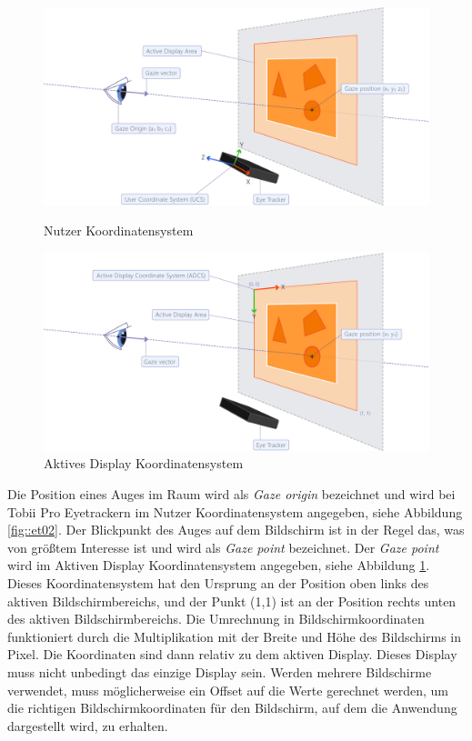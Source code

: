\begin{figure}[]
	\centering
	\begin{minipage}[b]{0.49\textwidth}
		\centering
		\includegraphics[width=1\textwidth]{../../Grafiken/UCS.png}
		\caption{Nutzer Koordinatensystem \cite{tobiisdk}}
		\label{fig::et02}
	\end{minipage}
	\hfill
	\begin{minipage}[b]{0.49\textwidth}
		\centering
		\includegraphics[width=1\textwidth]{../../Grafiken/ADCS.png}
		\caption{Aktives Display Koordinatensystem \cite{tobiisdk}}
		\label{fig::et03}
	\end{minipage}
\end{figure}
Die Position eines Auges im Raum wird als \emph{Gaze origin} bezeichnet und wird bei Tobii Pro Eyetrackern im Nutzer Koordinatensystem angegeben, siehe Abbildung \ref{fig::et02}.
Der Blickpunkt des Auges auf dem Bildschirm ist in der Regel das, was von größtem Interesse ist und wird als \emph{Gaze point} bezeichnet.
Der \emph{Gaze point} wird im Aktiven Display Koordinatensystem angegeben, siehe Abbildung \ref{fig::et03}.
Dieses Koordinatensystem hat den Ursprung an der Position oben links des aktiven Bildschirmbereichs, und der Punkt (1,1) ist an der Position rechts unten des aktiven Bildschirmbereichs.
Die Umrechnung in Bildschirmkoordinaten funktioniert durch die Multiplikation mit der Breite und Höhe des Bildschirms in Pixel.
Die Koordinaten sind dann relativ zu dem aktiven Display.
Dieses Display muss nicht unbedingt das einzige Display sein.
Werden mehrere Bildschirme verwendet, muss möglicherweise ein Offset auf die Werte gerechnet werden, um die richtigen Bildschirmkoordinaten für den Bildschirm, auf dem die Anwendung dargestellt wird, zu erhalten.

